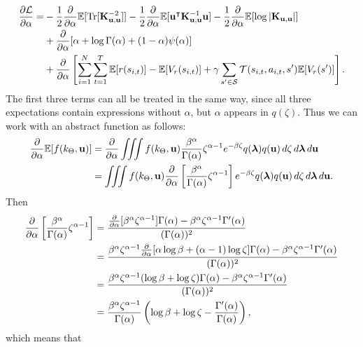 \documentclass{mprop}
\theoremstyle{definition}
\DeclareMathOperator{\Tr}{Tr}
\begin{document}
\[
  \begin{split}
    \frac{\partial\mathcal{L}}{\partial\alpha} = &-
    \frac{1}{2}\da\mathbb{E}[\Tr[\Kuu^{-2}]] -
    \frac{1}{2}\da\mathbb{E}[\mathbf{u}^\intercal\Kuu^{-1}\mathbf{u}] -
    \frac{1}{2}\da\mathbb{E}[\log|\Kuu|] \\
    &+ \da [\alpha + \log\Gamma(\alpha) + (1 -
      \alpha)\psi(\alpha)] \\
    &+ \da \left[ \sum_{i=1}^N \sum_{t=1}^T \mathbb{E}[r(s_{i,t})] -
      \mathbb{E}[V_r(s_{i,t})] + \gamma\sum_{s' \in \mathcal{S}}
      \mathcal{T}(s_{i,t}, a_{i,t}, s')\mathbb{E}[V_r(s')] \right].
  \end{split}
\]
The first three terms can all be treated in the same way, since all three
expectations contain expressions without $\alpha$, but $\alpha$ appears in
$q(\zeta)$. Thus we can work with an abstract function as follows:
\[
  \begin{split}
    \frac{\partial}{\partial\alpha}\mathbb{E}[f(k_\Theta, \mathbf{u})] &= \frac{\partial}{\partial\alpha} \iiint f(k_\Theta, \mathbf{u})
    \frac{\beta^\alpha}{\Gamma(\alpha)} \zeta^{\alpha - 1} e^{-\beta\zeta}
    q(\bm\lambda) q(\mathbf{u})\,d\zeta\,d\bm\lambda\,d\mathbf{u} \\
    &= \iiint f(k_\Theta, \mathbf{u})
    \frac{\partial}{\partial\alpha} \left[ \frac{\beta^\alpha}{\Gamma(\alpha)} \zeta^{\alpha - 1} \right]
      e^{-\beta\zeta}
    q(\bm\lambda) q(\mathbf{u})\,d\zeta\,d\bm\lambda\,d\mathbf{u}.
  \end{split}
\]
Then
\[
  \begin{split}
    \frac{\partial}{\partial\alpha} \left[ \frac{\beta^\alpha}{\Gamma(\alpha)} \zeta^{\alpha - 1} \right] &=
    \frac{\frac{\partial}{\partial\alpha}[\beta^\alpha\zeta^{\alpha - 1}]\Gamma(\alpha) -
      \beta^\alpha\zeta^{\alpha - 1}\Gamma'(\alpha)}{(\Gamma(\alpha))^2} \\
    &= \frac{\beta^\alpha\zeta^{\alpha - 1}\frac{\partial}{\partial\alpha}[\alpha\log\beta + (\alpha -
      1)\log\zeta]\Gamma(\alpha) - \beta^\alpha\zeta^{\alpha -
        1}\Gamma'(\alpha)}{(\Gamma(\alpha))^2} \\
    &= \frac{\beta^\alpha\zeta^{\alpha - 1}(\log\beta + \log\zeta)\Gamma(\alpha)
      - \beta^\alpha\zeta^{\alpha - 1}\Gamma'(\alpha)}{(\Gamma(\alpha))^2} \\
    &= \frac{\beta^\alpha\zeta^{\alpha - 1}}{\Gamma(\alpha)}\left(\log\beta +
    \log\zeta - \frac{\Gamma'(\alpha)}{\Gamma(\alpha)}\right),
  \end{split}
\]
which means that
\end{document}
